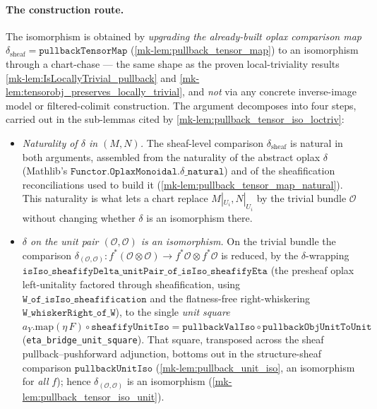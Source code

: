 \paragraph{The construction route.} The isomorphism is obtained by \emph{upgrading
the already-built oplax comparison map} \(\delta_{\mathrm{sheaf}} =
\mathtt{pullbackTensorMap}\) (\ref{mk-lem:pullback_tensor_map}) to an isomorphism
through a chart-chase --- the same shape as the proven local-triviality results
\ref{mk-lem:IsLocallyTrivial_pullback} and
\ref{mk-lem:tensorobj_preserves_locally_trivial}, and \emph{not} via any concrete
inverse-image model or filtered-colimit construction. The argument decomposes into
four steps, carried out in the sub-lemmas cited by
\ref{mk-lem:pullback_tensor_iso_loctriv}:
\begin{itemize}
  \item[(D1$'$)] \emph{Naturality of \(\delta\) in \((M,N)\).} The sheaf-level
    comparison \(\delta_{\mathrm{sheaf}}\) is natural in both arguments, assembled from
    the naturality of the abstract oplax \(\delta\) (Mathlib's
    \(\mathtt{Functor.OplaxMonoidal.}\delta\mathtt{\_natural}\)) and of the
    sheafification reconciliations used to build it
    (\ref{mk-lem:pullback_tensor_map_natural}). This naturality is what lets a chart
    replace \(M|_{U_i}, N|_{U_i}\) by the trivial bundle \(\mathcal{O}\) without
    changing whether \(\delta\) is an isomorphism there.
  \item[(D2$'$)] \emph{\(\delta\) on the unit pair \((\mathcal{O},\mathcal{O})\) is an
    isomorphism.} On the trivial bundle the comparison
    \(\delta_{(\mathcal{O},\mathcal{O})} : f^*(\mathcal{O} \otimes \mathcal{O}) \to
    f^*\mathcal{O} \otimes f^*\mathcal{O}\) is reduced, by the \(\delta\)-wrapping
    \(\mathtt{isIso\_sheafifyDelta\_unitPair\_of\_isIso\_sheafifyEta}\) (the presheaf
    oplax left-unitality factored through sheafification, using
    \(\mathtt{W\_of\_isIso\_sheafification}\) and the flatness-free right-whiskering
    \(\mathtt{W\_whiskerRight\_of\_W}\)), to the single \emph{unit square}
    \(a_Y.\mathrm{map}(\eta\,F) \circ \mathtt{sheafifyUnitIso} = \mathtt{pullbackValIso}
    \circ \mathtt{pullbackObjUnitToUnit}\) (\texttt{eta\_bridge\_unit\_square}). That
    square, transposed across the sheaf pullback--pushforward adjunction, bottoms out in
    the structure-sheaf comparison \(\mathtt{pullbackUnitIso}\)
    (\ref{mk-lem:pullback_unit_iso}, an isomorphism for \emph{all} \(f\)); hence
    \(\delta_{(\mathcal{O},\mathcal{O})}\) is an isomorphism
    (\ref{mk-lem:pullback_tensor_iso_unit}).

\end{itemize}
